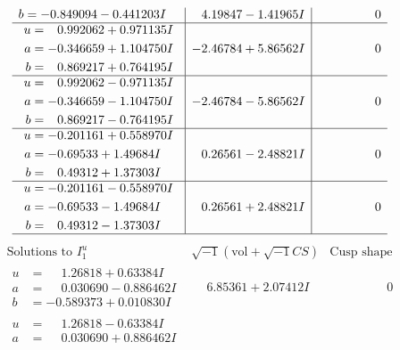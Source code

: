 \documentclass[1p]{elsarticle_modified}
\theoremstyle{definition}
\newcommand{\I}{\sqrt{-1}}
\begin{document}
$$\begin{array}{c|c|c}
\begin{aligned}
b &= -0.849094 - 0.441203 I\end{aligned}
 & \phantom{-}4.19847 - 1.41965 I & \phantom{-0.000000 } 0 \\ \hline\begin{aligned}
u &= \phantom{-}0.992062 + 0.971135 I \\
a &= -0.346659 + 1.104750 I \\
b &= \phantom{-}0.869217 + 0.764195 I\end{aligned}
 & -2.46784 + 5.86562 I & \phantom{-0.000000 } 0 \\ \hline\begin{aligned}
u &= \phantom{-}0.992062 - 0.971135 I \\
a &= -0.346659 - 1.104750 I \\
b &= \phantom{-}0.869217 - 0.764195 I\end{aligned}
 & -2.46784 - 5.86562 I & \phantom{-0.000000 } 0 \\ \hline\begin{aligned}
u &= -0.201161 + 0.558970 I \\
a &= -0.69533 + 1.49684 I \\
b &= \phantom{-}0.49312 + 1.37303 I\end{aligned}
 & \phantom{-}0.26561 - 2.48821 I & \phantom{-0.000000 } 0 \\ \hline\begin{aligned}
u &= -0.201161 - 0.558970 I \\
a &= -0.69533 - 1.49684 I \\
b &= \phantom{-}0.49312 - 1.37303 I\end{aligned}
 & \phantom{-}0.26561 + 2.48821 I & \phantom{-0.000000 } 0\\
 \hline 
 \end{array}$$\newpage$$\begin{array}{c|c|c}  
\text{Solutions to }I^u_{1}& \I (\text{vol} + \sqrt{-1}CS) & \text{Cusp shape}\\
 \hline 
\begin{aligned}
u &= \phantom{-}1.26818 + 0.63384 I \\
a &= \phantom{-}0.030690 - 0.886462 I \\
b &= -0.589373 + 0.010830 I\end{aligned}
 & \phantom{-}6.85361 + 2.07412 I & \phantom{-0.000000 } 0 \\ \hline\begin{aligned}
u &= \phantom{-}1.26818 - 0.63384 I \\
a &= \phantom{-}0.030690 + 0.886462 I \\

\end{aligned}
\end{array}$$
\end{document}
